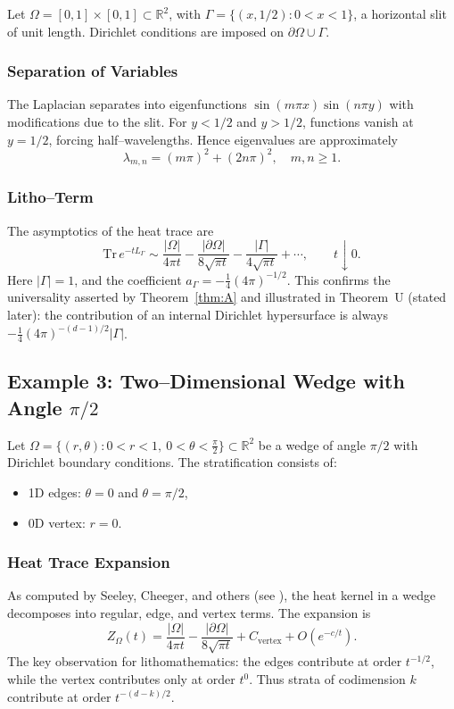 Let $\Omega = [0,1]\times[0,1] \subset \mathbb{R}^2$, 
with $\Gamma = \{(x,1/2): 0<x<1\}$, a horizontal slit of unit length. 
Dirichlet conditions are imposed on $\partial \Omega \cup \Gamma$. 

\subsubsection*{Separation of Variables}
The Laplacian separates into eigenfunctions 
$\sin(m\pi x)\sin(n\pi y)$ with modifications due to the slit. 
For $y<1/2$ and $y>1/2$, functions vanish at $y=1/2$, 
forcing half--wavelengths. 
Hence eigenvalues are approximately 
\[
\lambda_{m,n} = (m\pi)^2 + (2n\pi)^2, \quad m,n\ge 1.
\]

\subsubsection*{Litho--Term}
The asymptotics of the heat trace are
\[
\mathrm{Tr}\, e^{-tL_\Gamma} \sim 
\frac{|\Omega|}{4\pi t} - \frac{|\partial \Omega|}{8\sqrt{\pi t}}
- \frac{|\Gamma|}{4\sqrt{\pi t}} + \cdots, 
\qquad t \downarrow 0.
\]
Here $|\Gamma|=1$, and the coefficient $a_\Gamma = -\tfrac{1}{4}(4\pi)^{-1/2}$. 
This confirms the universality asserted by Theorem~\ref{thm:A} and 
illustrated in Theorem~U (stated later): the contribution of an internal 
Dirichlet hypersurface is always $-\tfrac{1}{4}(4\pi)^{-(d-1)/2}|\Gamma|$. 

\subsection{Example 3: Two--Dimensional Wedge with Angle $\pi/2$}

Let $\Omega = \{ (r,\theta): 0<r<1, \ 0<\theta<\tfrac{\pi}{2}\} \subset \mathbb{R}^2$ 
be a wedge of angle $\pi/2$ with Dirichlet boundary conditions. 
The stratification consists of:
\begin{itemize}
\item 1D edges: $\theta=0$ and $\theta=\pi/2$,
\item 0D vertex: $r=0$.
\end{itemize}

\subsubsection*{Heat Trace Expansion}
As computed by Seeley, Cheeger, and others (see \cite{Cheeger83}), 
the heat kernel in a wedge decomposes into regular, edge, and vertex terms. 
The expansion is
\[
Z_\Omega(t) = \frac{|\Omega|}{4\pi t} 
 - \frac{|\partial\Omega|}{8\sqrt{\pi t}} 
 + C_{\mathrm{vertex}} + O(e^{-c/t}).
\]
The key observation for lithomathematics: 
the edges contribute at order $t^{-1/2}$, 
while the vertex contributes only at order $t^0$. 
Thus strata of codimension $k$ contribute at order $t^{-(d-k)/2}$. 

